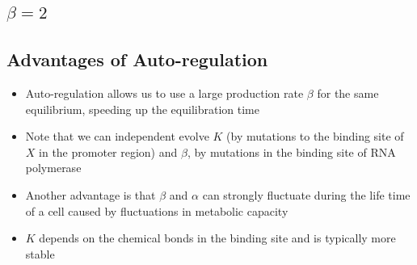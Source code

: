 
\begin{slide}
\section[-2]{$\beta=2$}
\pause\pb{}
\begin{center}
  \pause
\end{center}
\end{slide}



\begin{slide}
\section{Advantages of Auto-regulation}

\begin{PauseHighLight}
  \begin{itemize}
  \item Auto-regulation allows us to use a large production rate $\beta$
    for the same equilibrium, speeding up the equilibration time\pause
  \item Note that we can independent evolve $K$ (by mutations to the
    binding site of $X$ in the promoter region) and $\beta$, by
    mutations in the binding site of RNA polymerase\pause
  \item Another advantage is that $\beta$ and $\alpha$ can strongly
    fluctuate during the life time of a cell caused by fluctuations in
    metabolic capacity\pause
  \item $K$ depends on the chemical bonds in the binding site and is
    typically more stable\pause
  \end{itemize}
\end{PauseHighLight}

\end{slide}


